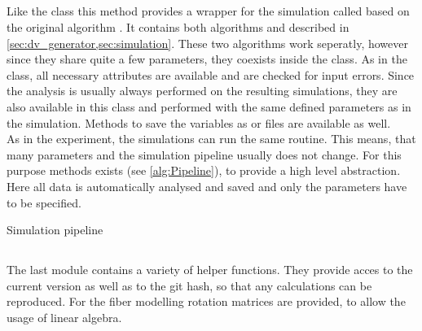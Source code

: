\subsection{}
Like the  class this method provides a wrapper for the simulation called  based on the original algorithm \cite{Dohmen2015,Lucksch2016}.
It contains both algorithms  and  described in \cref{sec:dv_generator,sec:simulation}.
These two algorithms work seperatly, however since they share quite a few parameters, they coexists inside the class.
As in the  class, all necessary attributes are available and are checked for input errors.
Since the analysis is usually always performed on the resulting simulations, they are also available in this class and performed with the same defined parameters as in the simulation.
Methods to save the variables as  or \hdf{} files are available as well.
\\
As in the experiment, the simulations can run the same routine.
This means, that many parameters and the simulation pipeline usually does not change.
For this purpose  methods exists (see \cref{alg:Pipeline}), to provide a high level abstraction.
Here all data is automatically analysed and saved and only the parameters have to be specified.
% 
\begin{lstfloat}[!tb]
\centering
\scalebox{0.75}{
\begin{minipage}{\the\textwidth}

\end{minipage}}
\caption{Simulation pipeline}
\label{alg:Pipeline}
\end{lstfloat}
% 
% 
\subsection{}
The last module contains a variety of helper functions.
They provide acces to the current version as well as to the git hash, so that any calculations can be reproduced.
For the fiber modelling rotation matrices are provided, to allow the usage of linear algebra.
% 
% 
% 
